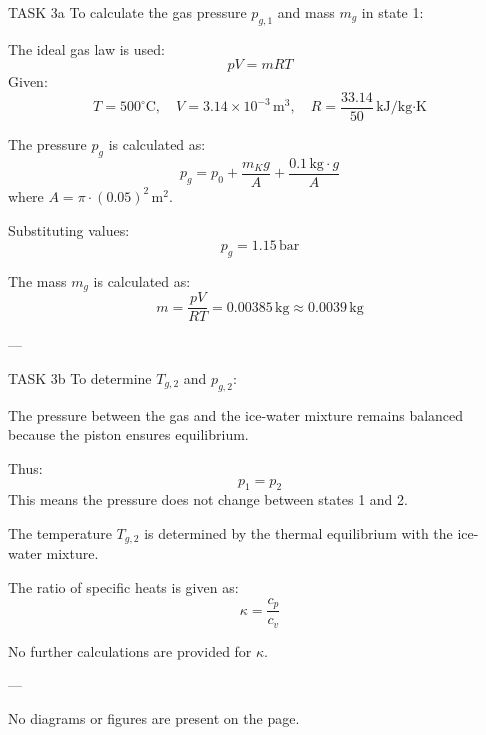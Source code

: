 TASK 3a  
To calculate the gas pressure \( p_{g,1} \) and mass \( m_g \) in state 1:  

The ideal gas law is used:  
\[
p V = m R T
\]  
Given:  
\[
T = 500^\circ\text{C}, \quad V = 3.14 \times 10^{-3} \, \text{m}^3, \quad R = \frac{33.14}{50} \, \text{kJ/kg·K}
\]  

The pressure \( p_g \) is calculated as:  
\[
p_g = p_0 + \frac{m_K g}{A} + \frac{0.1 \, \text{kg} \cdot g}{A}
\]  
where \( A = \pi \cdot (0.05)^2 \, \text{m}^2 \).  

Substituting values:  
\[
p_g = 1.15 \, \text{bar}
\]  

The mass \( m_g \) is calculated as:  
\[
m = \frac{p V}{R T} = 0.00385 \, \text{kg} \approx 0.0039 \, \text{kg}
\]  

---

TASK 3b  
To determine \( T_{g,2} \) and \( p_{g,2} \):  

The pressure between the gas and the ice-water mixture remains balanced because the piston ensures equilibrium.  

Thus:  
\[
p_1 = p_2
\]  
This means the pressure does not change between states 1 and 2.  

The temperature \( T_{g,2} \) is determined by the thermal equilibrium with the ice-water mixture.  

The ratio of specific heats is given as:  
\[
\kappa = \frac{c_p}{c_v}
\]  

No further calculations are provided for \( \kappa \).  

---

No diagrams or figures are present on the page.
